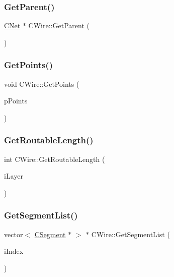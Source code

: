 \mbox{\label{classCWire_a98ece8df0778eb16cf0690c4aa5352f0}} 
\subsubsection{\texorpdfstring{GetParent()}{GetParent()}}
{\footnotesize\ttfamily \mbox{\hyperlink{classCNet}{C\+Net}} $\ast$ C\+Wire\+::\+Get\+Parent (\begin{DoxyParamCaption}{ }\end{DoxyParamCaption})\hspace{0.3cm}{\ttfamily [inline]}}

\mbox{\label{classCWire_a4799d4eeedb42ab2961ca93f25740368}} 
\subsubsection{\texorpdfstring{GetPoints()}{GetPoints()}}
{\footnotesize\ttfamily void C\+Wire\+::\+Get\+Points (\begin{DoxyParamCaption}\item[{vector$<$ \mbox{\hyperlink{classCPoint}{C\+Point}} $\ast$ $>$ $\ast$}]{p\+Points }\end{DoxyParamCaption})}

\mbox{\label{classCWire_af22afb5379acf1aa890692416c00b8e4}} 
\subsubsection{\texorpdfstring{GetRoutableLength()}{GetRoutableLength()}}
{\footnotesize\ttfamily int C\+Wire\+::\+Get\+Routable\+Length (\begin{DoxyParamCaption}\item[{int}]{i\+Layer }\end{DoxyParamCaption})}

\mbox{\label{classCWire_afab000638f87557894a8588f16ad0df4}} 
\subsubsection{\texorpdfstring{GetSegmentList()}{GetSegmentList()}}
{\footnotesize\ttfamily vector$<$ \mbox{\hyperlink{classCSegment}{C\+Segment}} $\ast$ $>$ $\ast$ C\+Wire\+::\+Get\+Segment\+List (\begin{DoxyParamCaption}\item[{int}]{i\+Index }\end{DoxyParamCaption})}

